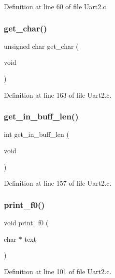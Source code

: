 Definition at line 60 of file Uart2.\+c.

\mbox{\label{_uart2_8c_a70497f17f225906dcf46bd79898a615d}} 
\subsubsection{get\+\_\+char()}
{\footnotesize\ttfamily unsigned char get\+\_\+char (\begin{DoxyParamCaption}\item[{void}]{ }\end{DoxyParamCaption})}



Definition at line 163 of file Uart2.\+c.

\mbox{\label{_uart2_8c_a4c3e6263e6d1bb276097e6d204ca10d6}} 
\subsubsection{get\+\_\+in\+\_\+buff\+\_\+len()}
{\footnotesize\ttfamily int get\+\_\+in\+\_\+buff\+\_\+len (\begin{DoxyParamCaption}\item[{void}]{ }\end{DoxyParamCaption})}



Definition at line 157 of file Uart2.\+c.

\mbox{\label{_uart2_8c_ab90488b2ab1ff8ae876e5da008de523b}} 
\subsubsection{print\+\_\+f0()}
{\footnotesize\ttfamily void print\+\_\+f0 (\begin{DoxyParamCaption}\item[{char $\ast$}]{text }\end{DoxyParamCaption})}



Definition at line 101 of file Uart2.\+c.

\mbox{\label{_uart2_8c_a4f2540c2811f6e4c4c136f964b5b8545}} 
